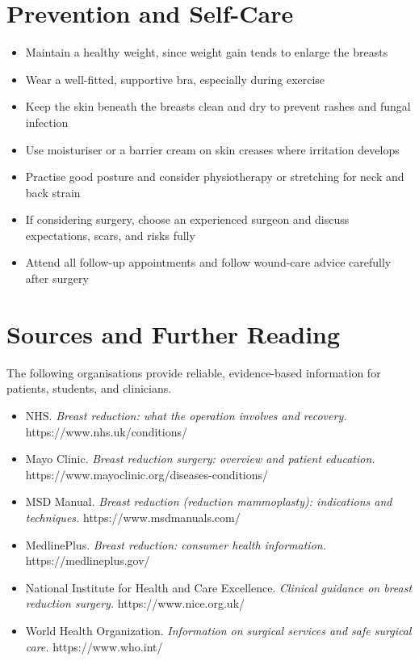 \section*{Prevention and Self-Care}
\begin{itemize}
    \item Maintain a healthy weight, since weight gain tends to enlarge the breasts
    \item Wear a well-fitted, supportive bra, especially during exercise
    \item Keep the skin beneath the breasts clean and dry to prevent rashes and fungal infection
    \item Use moisturiser or a barrier cream on skin creases where irritation develops
    \item Practise good posture and consider physiotherapy or stretching for neck and back strain
    \item If considering surgery, choose an experienced surgeon and discuss expectations, scars, and risks fully
    \item Attend all follow-up appointments and follow wound-care advice carefully after surgery
\end{itemize}

\section*{Sources and Further Reading}
The following organisations provide reliable, evidence-based information for patients, students, and clinicians.

\begin{itemize}
    \item NHS. \textit{Breast reduction: what the operation involves and recovery.} https://www.nhs.uk/conditions/
    \item Mayo Clinic. \textit{Breast reduction surgery: overview and patient education.} https://www.mayoclinic.org/diseases-conditions/
    \item MSD Manual. \textit{Breast reduction (reduction mammoplasty): indications and techniques.} https://www.msdmanuals.com/
    \item MedlinePlus. \textit{Breast reduction: consumer health information.} https://medlineplus.gov/
    \item National Institute for Health and Care Excellence. \textit{Clinical guidance on breast reduction surgery.} https://www.nice.org.uk/
    \item World Health Organization. \textit{Information on surgical services and safe surgical care.} https://www.who.int/
\end{itemize}
